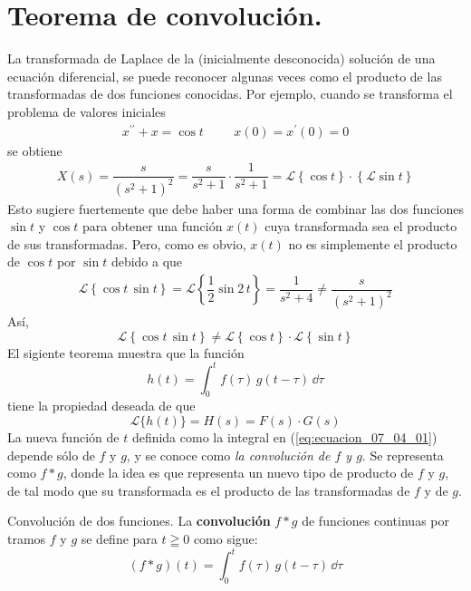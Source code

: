 \section{Teorema de convolución.}
La transformada de Laplace de la (inicialmente desconocida) solución de una ecuación diferencial, se puede reconocer algunas veces como el producto de las transformadas de dos funciones conocidas. Por ejemplo, cuando se transforma el problema de valores iniciales
\begin{align*}
x^{\prime \prime} + x = \cos t \hspace{1cm} x(0) = x^{\prime}(0) = 0
\end{align*}
se obtiene
\begin{align*}
X(s) = \dfrac{s}{(s^{2} + 1)^{2}} = \dfrac{s}{s^{2} + 1} \cdot \dfrac{1}{s^{2} + 1} = \mathscr{L} \left\{ \cos t \right\} \cdot \left\{ \mathscr{L} \sin t \right\}
\end{align*}
Esto sugiere fuertemente que debe haber una forma de combinar las dos funciones $\sin t$ y $\cos t$ para obtener una función $x(t)$ cuya transformada sea el producto de sus transformadas. Pero, como es obvio, $x(t)$ no es simplemente el producto de $\cos t$ por $\sin t$ debido a que 
\begin{align*}
\mathscr{L} \left\{ \cos t \, \sin t \right\} = \mathscr{L} \left\{ \dfrac{1}{2} \sin 2 \, t \right\} = \dfrac{1}{s^{2} + 4} \neq \dfrac{s}{(s^{2} + 1)^{2}}
\end{align*}
Así,
\[ \mathscr{L} \left\{ \cos t \, \sin t \right\} \neq \mathscr{L} \left\{ \cos t \right\} \cdot \mathscr{L} \left\{ \sin t \right\} \]
El sigiente teorema muestra que la función
\begin{equation}
h(t) = \int_{0}^{t} f(\tau) \, g(t - \tau) \, \dd{\tau}
\label{eq:ecuacion_07_04_01}
\end{equation}
tiene la propiedad deseada de que
\begin{equation}
\mathscr{L} \{ h(t) \} = H(s) = F(s) \cdot G(s)
\label{eq:ecuacion_07_04_02}
\end{equation}
La nueva función de $t$ definida como la integral en (\ref{eq:ecuacion_07_04_01}) depende sólo de $f$ y $g$, y se  conoce como \emph{la convolución de $f$ y $g$}. Se representa como $f * g$, donde la idea es que representa un nuevo tipo de producto de $f$  y $g$, de tal modo que su transformada es el producto de las transformadas de $f$  y de $g$.
\begin{defi}{Convolución de dos funciones.}
La \textbf{convolución} $f * g$ de funciones continuas por tramos $f$ y $g$ se define para $t \geqq 0$ como sigue:
\begin{equation}
(f * g)(t) = \int_{0}^{t} f(\tau) \, g(t - \tau) \, \dd{\tau}
\label{eq:ecuacion_07_04_03}
\end{equation}
\end{defi}
